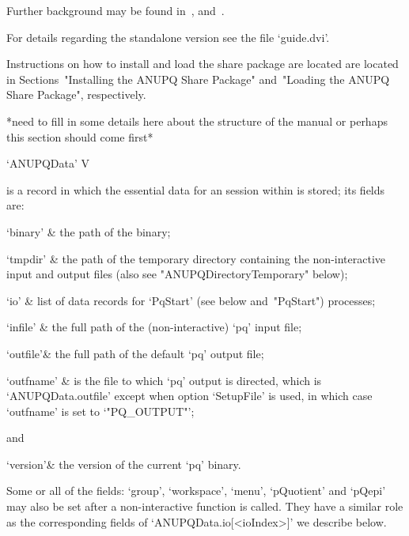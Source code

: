 \endlist

Further   background   may   be   found   in~\cite{OBr95},   \cite{Vau84}
and~\cite{NNN98}.

For details regarding the standalone version see the file `guide.dvi'.


Instructions on how to install and load the {\ANUPQ}  share  package  are
located are located in  Sections~"Installing  the  ANUPQ  Share  Package"
and~"Loading the ANUPQ Share Package", respectively.

*need to fill in some details here about the structure of the manual
 or perhaps this section should come first*


\>`ANUPQData' V

is a {\GAP} record in which the essential data for  an  {\ANUPQ}  session
within {\GAP} is stored; its fields are:

\beginitems

\quad`binary' & the path of the {\ANUPQ} binary;

\quad`tmpdir' & the  path  of  the  temporary  directory  containing  the
non-interactive   {\ANUPQ}   input   and   output   files    (also    see
"ANUPQDirectoryTemporary" below);

\quad`io' & list of data records for `PqStart' (see below  and~"PqStart")
processes;

\quad`infile' & the full path of the (non-interactive) `pq' input file;

\quad`outfile'& the full path of the default `pq' output  file;

\quad`outfname' & is the file to which `pq' output is directed, which  is
`ANUPQData.outfile' except when option `SetupFile' is used, in which case
`outfname' is set to `"PQ_OUTPUT"';

and

\quad`version'& the version of the current `pq' binary.

\enditems

Some or all of the fields: `group', `workspace', `menu', `pQuotient'  and
`pQepi' may also be set after  a  non-interactive  {\ANUPQ}  function  is
called.  They  have  a  similar  role  as  the  corresponding  fields  of
`ANUPQData.io[<ioIndex>]' we describe below.


